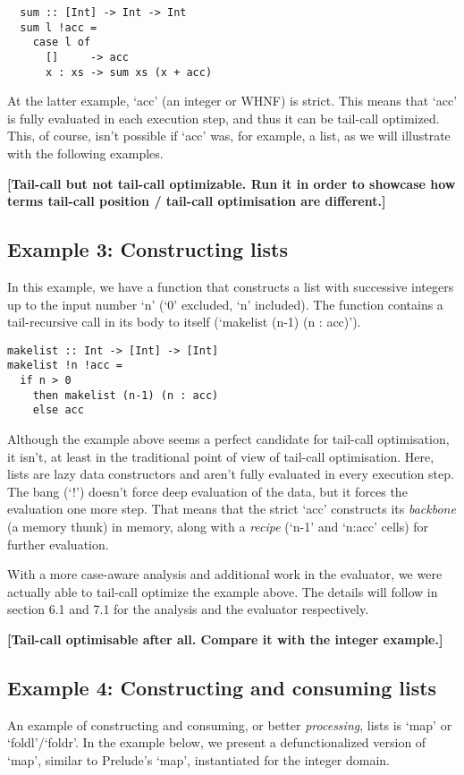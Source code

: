 \documentclass[diploma]{softlab-thesis}
\begin{document}
\begin{verbatim}
  sum :: [Int] -> Int -> Int
  sum l !acc = 
    case l of 
      []     -> acc 
      x : xs -> sum xs (x + acc) 
\end{verbatim}

At the latter example, `acc' (an integer or WHNF) is strict. This means that `acc' is 
fully evaluated in each execution step, and thus it can be tail-call optimized. This, of course,
isn't possible if `acc' was, for example, a list, as we will illustrate with the following examples.

\textbf{[Tail-call but not tail-call optimizable. Run it in order to showcase how terms 
tail-call position / tail-call optimisation are different.]}

\subsection {Example 3: Constructing lists}
In this example, we have a function that constructs a list with successive 
integers up to the input number `n' (`0' excluded, `n' included). The function contains 
a tail-recursive call in its body to itself (`makelist (n-1) (n : acc)'). 

\begin{verbatim}
makelist :: Int -> [Int] -> [Int]
makelist !n !acc = 
  if n > 0 
    then makelist (n-1) (n : acc)
    else acc
\end{verbatim}

Although the example above seems a perfect candidate for tail-call optimisation, it isn't, 
at least in the traditional point of view of tail-call optimisation. Here, lists are 
lazy data constructors and aren't fully evaluated in every execution step. The bang (`!') doesn't 
force deep evaluation of the data, but it forces the evaluation one more step. That means that the strict 
`acc' constructs its \textit{backbone} (a memory thunk) in memory, along with a \textit{recipe} 
(`n-1' and `n:acc' cells) for further evaluation. 

With a more case-aware analysis and additional work in the evaluator, 
we were actually able to tail-call optimize the example 
above. The details will follow in section 6.1 and 7.1 for the analysis 
and the evaluator respectively. 

\textbf{[Tail-call optimisable after all. Compare it with the integer example.]}

\subsection {Example 4: Constructing and consuming lists}
An example of constructing and consuming, or better \textit{processing}, lists is `map' or `foldl'/`foldr'.
In the example below, we present a defunctionalized version of `map', similar to Prelude's `map', instantiated for
the integer domain.
\end{document}

